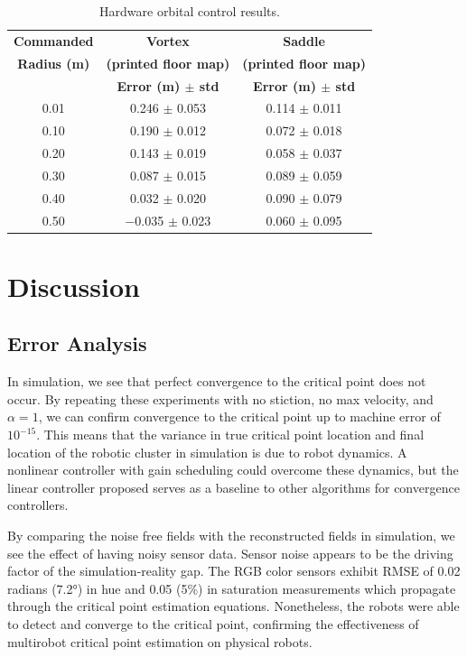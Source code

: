 \documentclass[lettersize,journal]{IEEEtran}
\begin{document}
\begin{table}[!t]
    \centering
    \caption{Hardware orbital control results.}
    \label{tab:orbital_radius_comparison}
    \begin{tabular}{ccc}
    \hline
    \textbf{Commanded} & \textbf{Vortex} & \textbf{Saddle} \\
    \textbf{Radius (m)} & \textbf{(printed floor map)} & \textbf{(printed floor map)} \\
     & \textbf{Error (m) $\pm$ std} & \textbf{Error (m) $\pm$ std} \\
    \hline
    0.01 & 0.246 $\pm$ 0.053 & 0.114 $\pm$ 0.011 \\
    0.10 & 0.190 $\pm$ 0.012 & 0.072 $\pm$ 0.018 \\
    0.20 & 0.143 $\pm$ 0.019 & 0.058 $\pm$ 0.037 \\
    0.30 & 0.087 $\pm$ 0.015 & 0.089 $\pm$ 0.059 \\
    0.40 & 0.032 $\pm$ 0.020 & 0.090 $\pm$ 0.079 \\
    0.50 & $-$0.035 $\pm$ 0.023 & 0.060 $\pm$ 0.095 \\
    \hline
    \end{tabular}
    \end{table}


\section{Discussion}

\subsection{Error Analysis}

In simulation, we see that perfect convergence to the critical point does not occur. By repeating these experiments with no stiction, no max velocity, and $\alpha = 1$, we can confirm convergence to the critical point up to machine error of $10^{-15}$. This means that the variance in true critical point location and final location of the robotic cluster in simulation is due to robot dynamics. A nonlinear controller with gain scheduling could overcome these dynamics, but the linear controller proposed serves as a baseline to other algorithms for convergence controllers.

By comparing the noise free fields with the reconstructed fields in simulation, we see the effect of having noisy sensor data. Sensor noise appears to be the driving factor of the simulation-reality gap. The RGB color sensors exhibit RMSE of 0.02 radians (7.2°) in hue and 0.05 (5\%) in saturation measurements which propagate through the critical point estimation equations. Nonetheless, the robots were able to detect and converge to the critical point, confirming the effectiveness of multirobot critical point estimation on physical robots.
\end{document}
